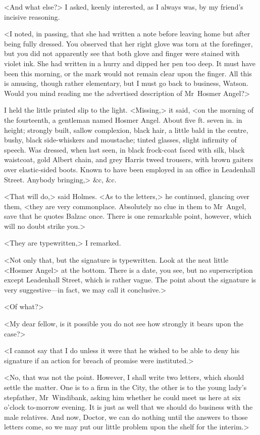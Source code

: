 <And what else?> I asked, keenly interested, as I always was, by my friend's incisive reasoning.

<I noted, in passing, that she had written a note before leaving home but after being fully dressed. You observed that her right glove was torn at the forefinger, but you did not apparently see that both glove and finger were stained with violet ink. She had written in a hurry and dipped her pen too deep. It must have been this morning, or the mark would not remain clear upon the finger. All this is amusing, though rather elementary, but I must go back to business, Watson. Would you mind reading me the advertised description of Mr~Hosmer Angel?>

I held the little printed slip to the light. <Missing,> it said, <on the morning of the fourteenth, a gentleman named Hosmer Angel. About five ft. seven in. in height; strongly built, sallow complexion, black hair, a little bald in the centre, bushy, black side-whiskers and moustache; tinted glasses, slight infirmity of speech. Was dressed, when last seen, in black frock-coat faced with silk, black waistcoat, gold Albert chain, and grey Harris tweed trousers, with brown gaiters over elastic-sided boots. Known to have been employed in an office in Leadenhall Street. Anybody bringing,> \&c, \&c.

<That will do,> said Holmes. <As to the letters,> he continued, glancing over them, <they are very commonplace. Absolutely no clue in them to Mr~Angel, save that he quotes Balzac once. There is one remarkable point, however, which will no doubt strike you.>

<They are typewritten,> I remarked.

<Not only that, but the signature is typewritten. Look at the neat little <Hosmer Angel> at the bottom. There is a date, you see, but no superscription except Leadenhall Street, which is rather vague. The point about the signature is very suggestive—in fact, we may call it conclusive.>

<Of what?>

<My dear fellow, is it possible you do not see how strongly it bears upon the case?>

<I cannot say that I do unless it were that he wished to be able to deny his signature if an action for breach of promise were instituted.>

<No, that was not the point. However, I shall write two letters, which should settle the matter. One is to a firm in the City, the other is to the young lady's stepfather, Mr~Windibank, asking him whether he could meet us here at six o'clock to-morrow evening. It is just as well that we should do business with the male relatives. And now, Doctor, we can do nothing until the answers to those letters come, so we may put our little problem upon the shelf for the interim.>

